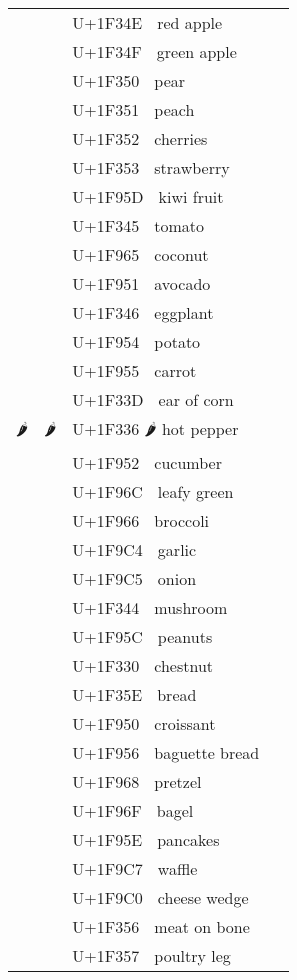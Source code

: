 \documentclass[a4paper,12pt]{article}
\newcommand{\fontA}[1]{{\fontspec[RawFeature={mode=harf,+dist,+ccmp}]{Segoe UI Emoji} #1}}
\newcommand{\fontB}[1]{{\fontspec[RawFeature={mode=harf,+dist,+ccmp}]{Noto Color Emoji} #1}}
\begin{document}
\begin{longtable}[c]{ccp{0.8\linewidth}}
\fontA{🍎}&\fontB{🍎}&U+1F34E 🍎 red apple\\
\fontA{🍏}&\fontB{🍏}&U+1F34F 🍏 green apple\\
\fontA{🍐}&\fontB{🍐}&U+1F350 🍐 pear\\
\fontA{🍑}&\fontB{🍑}&U+1F351 🍑 peach\\
\fontA{🍒}&\fontB{🍒}&U+1F352 🍒 cherries\\
\fontA{🍓}&\fontB{🍓}&U+1F353 🍓 strawberry\\
\fontA{🥝}&\fontB{🥝}&U+1F95D 🥝 kiwi fruit\\
\fontA{🍅}&\fontB{🍅}&U+1F345 🍅 tomato\\
\fontA{🥥}&\fontB{🥥}&U+1F965 🥥 coconut\\
\fontA{🥑}&\fontB{🥑}&U+1F951 🥑 avocado\\
\fontA{🍆}&\fontB{🍆}&U+1F346 🍆 eggplant\\
\fontA{🥔}&\fontB{🥔}&U+1F954 🥔 potato\\
\fontA{🥕}&\fontB{🥕}&U+1F955 🥕 carrot\\
\fontA{🌽}&\fontB{🌽}&U+1F33D 🌽 ear of corn\\
\fontA{🌶}&\fontB{🌶}&U+1F336 🌶 hot pepper\\
\fontA{🥒}&\fontB{🥒}&U+1F952 🥒 cucumber\\
\fontA{🥬}&\fontB{🥬}&U+1F96C 🥬 leafy green\\
\fontA{🥦}&\fontB{🥦}&U+1F966 🥦 broccoli\\
\fontA{🧄}&\fontB{🧄}&U+1F9C4 🧄 garlic\\
\fontA{🧅}&\fontB{🧅}&U+1F9C5 🧅 onion\\
\fontA{🍄}&\fontB{🍄}&U+1F344 🍄 mushroom\\
\fontA{🥜}&\fontB{🥜}&U+1F95C 🥜 peanuts\\
\fontA{🌰}&\fontB{🌰}&U+1F330 🌰 chestnut\\
\fontA{🍞}&\fontB{🍞}&U+1F35E 🍞 bread\\
\fontA{🥐}&\fontB{🥐}&U+1F950 🥐 croissant\\
\fontA{🥖}&\fontB{🥖}&U+1F956 🥖 baguette bread\\
\fontA{🥨}&\fontB{🥨}&U+1F968 🥨 pretzel\\
\fontA{🥯}&\fontB{🥯}&U+1F96F 🥯 bagel\\
\fontA{🥞}&\fontB{🥞}&U+1F95E 🥞 pancakes\\
\fontA{🧇}&\fontB{🧇}&U+1F9C7 🧇 waffle\\
\fontA{🧀}&\fontB{🧀}&U+1F9C0 🧀 cheese wedge\\
\fontA{🍖}&\fontB{🍖}&U+1F356 🍖 meat on bone\\
\fontA{🍗}&\fontB{🍗}&U+1F357 🍗 poultry leg\\

\end{longtable}
\end{document}
